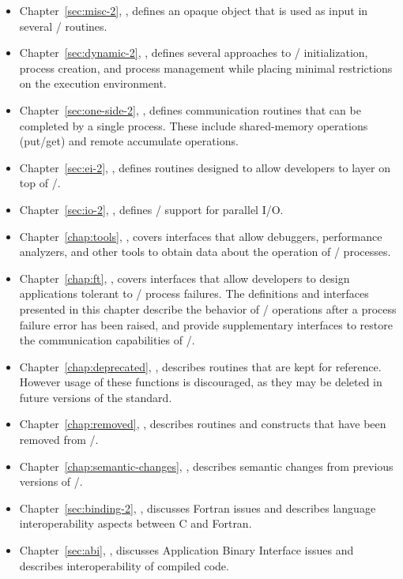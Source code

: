 \begin{itemize}
\item
Chapter~\ref{sec:misc-2}, , defines an opaque object that is used as input in several \MPI/ routines.
\item
Chapter~\ref{sec:dynamic-2}, ,
defines
several approaches to \MPI/ initialization, process creation,
and process management while placing minimal restrictions on the execution environment.
\item
Chapter~\ref{sec:one-side-2}, , defines
communication routines that can be completed by a single process.  These include
shared-memory operations (put/get) and remote accumulate operations.
\item
Chapter~\ref{sec:ei-2}, ,
defines routines designed to allow developers to layer on
top of \MPI/.
\item
Chapter~\ref{sec:io-2}, , defines
\MPI/
support for parallel I/O.
\item
Chapter~\ref{chap:tools}, ,
covers interfaces that allow debuggers, performance
analyzers, and other tools to obtain data about the operation of \MPI/
processes.
\item
Chapter~\ref{chap:ft}, ,
covers interfaces that allow developers to design applications tolerant to
\MPI/ process failures. The definitions and interfaces presented in this
chapter describe the behavior of \MPI/ operations after a process failure
error has been raised, and provide supplementary interfaces to restore the
communication capabilities of \MPI/.
\item
Chapter~\ref{chap:deprecated}, , describes routines that
are kept for reference. However usage of these functions is discouraged, as
they may be deleted in future versions of the standard.
\item
Chapter~\ref{chap:removed}, , describes
routines and constructs that have been removed from \MPI/.
\item
Chapter~\ref{chap:semantic-changes}, , describes
semantic changes from previous versions of \MPI/.
\item
Chapter~\ref{sec:binding-2},
, discusses Fortran issues
and describes language interoperability aspects between
C and Fortran.
\item
Chapter~\ref{sec:abi},
, discusses Application Binary Interface issues
and describes interoperability of compiled code.
\end{itemize}

